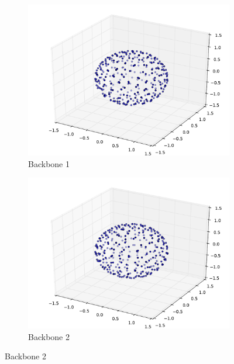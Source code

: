 \documentclass[oneside, titlepage]{scrartcl}
\begin{document}
\begin{figure}[!h]
\begin{subfigure}{0.5\textwidth}
	\centering
	\includegraphics[width=0.9\linewidth]{figures/simplegraph8.pdf}
	\caption{Backbone 1}
\end{subfigure}%
\begin{subfigure}{0.5\textwidth}
	\centering
	\includegraphics[width=0.9\linewidth]{figures/simplegraph81.pdf}
	\caption{Backbone 2}
\end{subfigure}
\end{figure}
\end{document}
